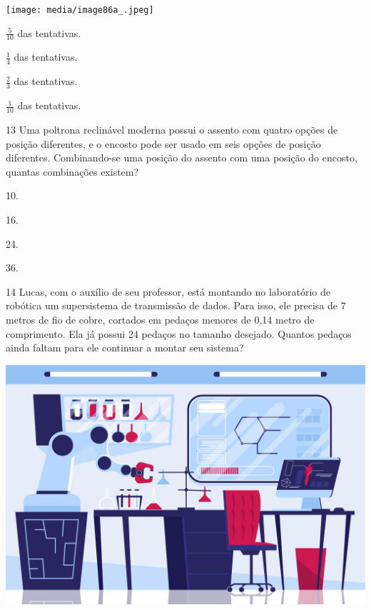 \begin{center}
\texttt{[image: media/image86a\_.jpeg]}
\end{center}

\begin{escolha}
\item
  $\frac{5}{10}$ das tentativas.
\item
  $\frac{1}{4}$ das tentativas.
\item
  $\frac{2}{3}$ das tentativas.
\item
  $\frac{1}{10}$ das tentativas.
\end{escolha}


\num{13} Uma poltrona reclinável moderna possui o assento com quatro opções de posição
diferentes, e o encosto pode ser usado em seis opções de posição diferentes. Combinando-se uma posição do assento com uma posição do encosto, quantas combinações existem?

\begin{escolha}
\item
  10.
\item
  16.
\item
  24.
\item
  36.
\end{escolha}

\pagebreak

\num{14} Lucas, com o auxílio de seu professor, está montando no laboratório de
robótica um supersistema de transmissão de dados. Para isso, ele
precisa de 7 metros de fio de cobre, cortados em pedaços menores de 0,14
metro de comprimento. Ela já possui 24 pedaços no tamanho desejado. Quantos pedaços ainda
faltam para ele continuar a montar seu sistema?

\begin{center}
\includegraphics[width=.8\textwidth]{media/image86b_.jpeg}
\end{center}


